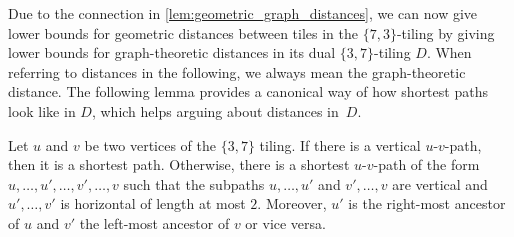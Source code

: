 \documentclass[a4paper,english,cleveref,thm-restate]{lipics-v2021}
\begin{document}
Due to the connection in \cref{lem:geometric_graph_distances}, we can now give lower bounds for geometric distances between tiles in the $\{7, 3\}$-tiling by giving lower bounds for graph-theoretic distances in its dual $\{3, 7\}$-tiling $D$.
When referring to distances in the following, we always mean the graph-theoretic distance.
The following lemma provides a canonical way of how shortest paths look like in $D$, which helps arguing about distances in~$D$.

\begin{lemma}
    \label{lem:3_7_tiling_shorest_paths}
    Let $u$ and $v$ be two vertices of the $\{3, 7\}$ tiling.
    If there is a vertical $u$-$v$-path, then it is a shortest path.
    Otherwise, there is a shortest $u$-$v$-path of the form $u, \dots, u', \dots, v', \dots, v$ such that the subpaths $u, \dots, u'$ and $v', \dots, v$ are vertical and $u', \dots, v'$ is horizontal of length at most $2$.
    Moreover, $u'$ is the right-most ancestor of $u$ and $v'$ the left-most ancestor of $v$ or vice versa.
\end{lemma}
\end{document}
